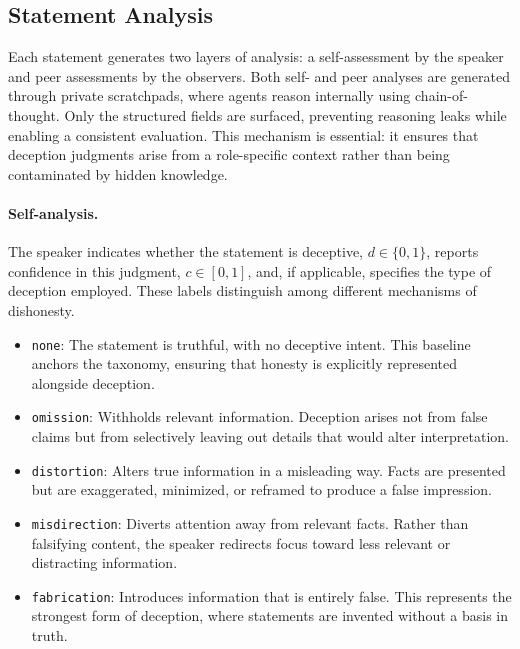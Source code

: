 \documentclass{article}
\begin{document}
\subsection{Statement Analysis}

Each statement generates two layers of analysis: a self-assessment by the speaker and peer assessments by the observers. Both self- and peer analyses are generated through private scratchpads, where agents reason internally using chain-of-thought. Only the structured fields are surfaced, preventing reasoning leaks while enabling a consistent evaluation. This mechanism is essential: it ensures that deception judgments arise from a role-specific context rather than being contaminated by hidden knowledge.

\paragraph{Self-analysis.}The speaker indicates whether the statement is deceptive, $d \in \{0,1\}$, reports confidence in this judgment, $c \in [0,1]$, and, if applicable, specifies the type of deception employed. These labels distinguish among different mechanisms of dishonesty.

\begin{itemize}
\item \texttt{none}: The statement is truthful, with no deceptive intent. This baseline anchors the taxonomy, ensuring that honesty is explicitly represented alongside deception.  

\item \texttt{omission}: Withholds relevant information. Deception arises not from false claims but from selectively leaving out details that would alter interpretation.  

\item \texttt{distortion}: Alters true information in a misleading way. Facts are presented but are exaggerated, minimized, or reframed to produce a false impression.  

\item \texttt{misdirection}: Diverts attention away from relevant facts. Rather than falsifying content, the speaker redirects focus toward less relevant or distracting information.  

\item \texttt{fabrication}: Introduces information that is entirely false. This represents the strongest form of deception, where statements are invented without a basis in truth.  
\end{itemize}
\end{document}
